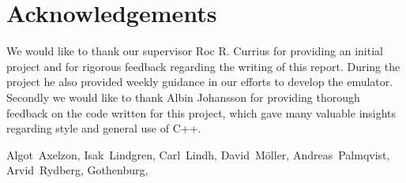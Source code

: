 \thispagestyle{plain}			%
\section*{\centering Acknowledgements}

We would like to thank our supervisor Roc R. Currius for providing an initial project and for rigorous feedback regarding the writing of this report. During the project he also provided weekly guidance in our efforts to develop the emulator.
Secondly we would like to thank Albin Johansson for providing thorough feedback on the code written for this project, which gave many valuable insights regarding style and general use of C++. 

\vspace{1.5cm}
\hfill
Algot~Axelzon, Isak~Lindgren, Carl~Lindh, David~Möller, Andreas~Palmqvist, Arvid~Rydberg, Gothenburg, \monthname \space \the\year

\newpage				%
\thispagestyle{plain}
\mbox{}